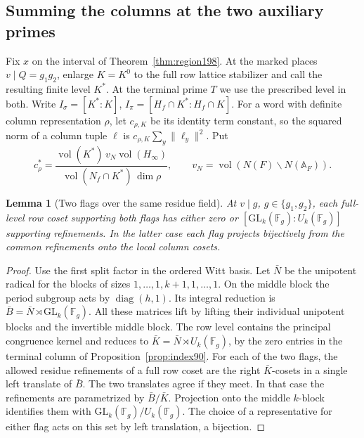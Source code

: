 \documentclass[a4paper,11pt]{article}
\newtheorem{lemma}[proposition]{Lemma}
\theoremstyle{definition}
\theoremstyle{remark}
\numberwithin{equation}{section}
\begin{document}
\subsection{Summing the columns at the two auxiliary primes}\label{nav:IX-21}
Fix \(x\) on the interval of Theorem~\ref{thm:region198}. At the
marked places \(v\mid Q=g_1g_2\), enlarge \(K=K^0\) to the full
row lattice stabilizer and call the resulting finite level \(K^*\).
At the terminal prime \(T\) we use the prescribed level in both.
Write \(I_\sigma=[K^*:K]\),
\(I_\pi=[H_f\cap K^*:H_f\cap K]\). For a word with definite
column representation \(\rho\), let \(c_{\rho,K}\) be its identity
term constant, so the squared norm of a column tuple \(\ell\)
is \(c_{\rho,K}\sum_y\|\ell_y\|^2\). Put
\[
 c_\rho^*=
 \frac{\operatorname{vol}(K^*)\,v_N\operatorname{vol}(H_\infty)}
      {\operatorname{vol}(N_f\cap K^*)\,\dim\rho},
 \qquad v_N=\operatorname{vol}(N(F)\backslash N(\mathbb A_F)).
\]

\begin{lemma}[Two flags over the same residue field]
\label{lem:refine212}
At \(v\mid g\), \(g\in\{g_1,g_2\}\), each full-level row coset
supporting both flags has either zero or
\([\mathrm{GL}_k(\mathbb F_g):U_k(\mathbb F_g)]\) supporting
refinements. In the latter case each flag projects bijectively
from the common refinements onto the local column cosets.
\end{lemma}
\begin{proof}
Use the first split factor in the ordered Witt basis. Let \(\bar N\)
be the unipotent radical for the blocks of sizes
\(1,\ldots,1,k+1,1,\ldots,1\). On the middle block the period
subgroup acts by \(\operatorname{diag}(h,1)\). Its integral
reduction is \(\bar B=\bar N\rtimes\mathrm{GL}_k(\mathbb F_g)\).
All these matrices lift by lifting their individual unipotent
blocks and the invertible middle block. The row level contains
the principal congruence kernel and reduces to
\(\bar K=\bar N\rtimes U_k(\mathbb F_g)\), by the zero entries
in the terminal column of Proposition~\ref{prop:index90}.
For each of the two flags, the allowed residue refinements of
a full row coset are the right \(\bar K\)-cosets in a single
left translate of \(\bar B\). The two translates agree if they
meet. In that case the refinements are parametrized by
\(\bar B/\bar K\). Projection onto the middle \(k\)-block
identifies them with \(\mathrm{GL}_k(\mathbb F_g)/U_k(\mathbb F_g)\).
The choice of a representative for either flag acts on this
set by left translation, a bijection.
\end{proof}
\end{document}
